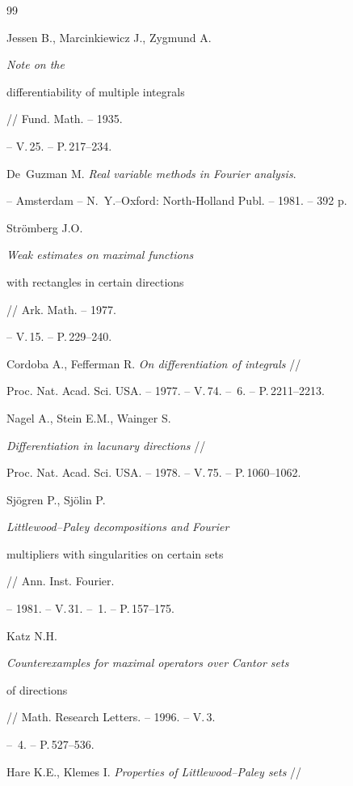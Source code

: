 \begin{thebibliography}{99}







Jessen B., Marcinkiewicz J., Zygmund A. {\it Note on the


differentiability of multiple integrals} // Fund. Math. -- 1935.


-- V.\,25. -- P.\,217--234.




De~Guzman M. {\it Real variable methods in Fourier analysis}.


-- Amsterdam -- N.~Y.--Oxford: North-Holland Publ. -- 1981. -- 392 p.




Str\"omberg J.O. {\it Weak estimates on maximal functions


with rectangles in certain directions} // Ark. Math. -- 1977.


-- V.\,15. -- P.\,229--240.




Cordoba A., Fefferman R. {\it On differentiation of integrals} //


Proc. Nat. Acad. Sci. USA. -- 1977. -- V.\,74. -- \No\,6. -- P.\,2211--2213.




Nagel A., Stein E.M., Wainger S.


{\it Differentiation in lacunary directions} //


Proc. Nat. Acad. Sci. USA. -- 1978. -- V.\,75. -- P.\,1060--1062.




Sj\"ogren P., Sj\"olin P. {\it Littlewood--Paley decompositions and Fourier


multipliers with singularities on certain sets} //  Ann. Inst. Fourier.


-- 1981. -- V.\,31. -- \No\,1. -- P.\,157--175.




Katz N.H. {\it Counterexamples for maximal operators over Cantor sets


of directions} // Math. Research Letters. -- 1996. -- V.\,3.


-- \No\,4. -- P.\,527--536.




Hare K.E., Klemes I. {\it Properties of Littlewood--Paley sets} //



\end{thebibliography}
